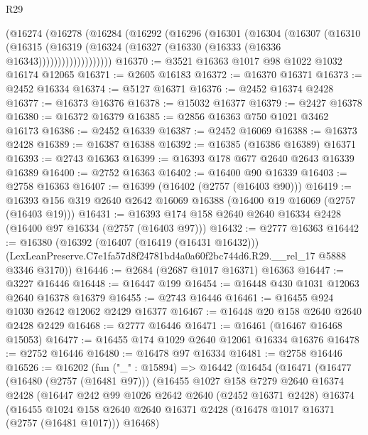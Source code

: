 \begin{lexlean}{R29}
\begin{coremodule}
          (@16274
            (@16278
              (@16284
                (@16292
                  (@16296
                    (@16301
                      (@16304
                        (@16307
                          (@16310
                            (@16315
                              (@16319
                                (@16324 (@16327 (@16330 (@16333 (@16336 @16343)))))))))))))))))))
@16370 := @3521 @16363 @1017 @98 @1022 @1032 @16174 @12065
@16371 := @2605 @16183
@16372 := @16370 @16371
@16373 := @2452 @16334
@16374 := @5127 @16371
@16376 := @2452 @16374 @2428
@16377 := @16373 @16376
@16378 := @15032 @16377
@16379 := @2427 @16378
@16380 := @16372 @16379
@16385 := @2856 @16363 @750 @1021 @3462 @16173
@16386 := @2452 @16339
@16387 := @2452 @16069
@16388 := @16373 @2428
@16389 := @16387 @16388
@16392 := @16385 (@16386 @16389) @16371
@16393 := @2743 @16363
@16399 := @16393 @178 @677 @2640 @2643 @16339 @16389
@16400 := @2752 @16363
@16402 := @16400 @90 @16339
@16403 := @2758 @16363
@16407 := @16399 (@16402 (@2757 (@16403 @90)))
@16419 := @16393 @156 @319 @2640 @2642 @16069 @16388 (@16400 @19 @16069 (@2757 (@16403 @19)))
@16431 := @16393 @174 @158 @2640 @2640 @16334 @2428 (@16400 @97 @16334 (@2757 (@16403 @97)))
@16432 := @2777 @16363
@16442 := @16380
    (@16392
      (@16407 (@16419 (@16431 @16432)))
      (LexLeanPreserve.C7e1fa57d8f24781bd4a0a60f2bc744d6.R29.__rel_17 @5888 @3346 @3170))
@16446 := @2684 (@2687 @1017 @16371) @16363
@16447 := @3227 @16446
@16448 := @16447 @199
@16454 := @16448 @430 @1031 @12063 @2640 @16378 @16379
@16455 := @2743 @16446
@16461 := @16455 @924 @1030 @2642 @12062 @2429 @16377
@16467 := @16448 @20 @158 @2640 @2640 @2428 @2429
@16468 := @2777 @16446
@16471 := @16461 (@16467 @16468 @15053)
@16477 := @16455 @174 @1029 @2640 @12061 @16334 @16376
@16478 := @2752 @16446
@16480 := @16478 @97 @16334
@16481 := @2758 @16446
@16526 := @16202
    (fun ("_" : @15894) =>
    @16442
      (@16454
        (@16471
          (@16477
            (@16480 (@2757 (@16481 @97)))
            (@16455
              @1027
              @158
              @7279
              @2640
              @16374
              @2428
              (@16447
                @242
                @99
                @1026
                @2642
                @2640
                (@2452 @16371 @2428)
                @16374
                (@16455
                  @1024
                  @158
                  @2640
                  @2640
                  @16371
                  @2428
                  (@16478 @1017 @16371 (@2757 (@16481 @1017)))
                  @16468)

\end{coremodule}
\end{lexlean}
